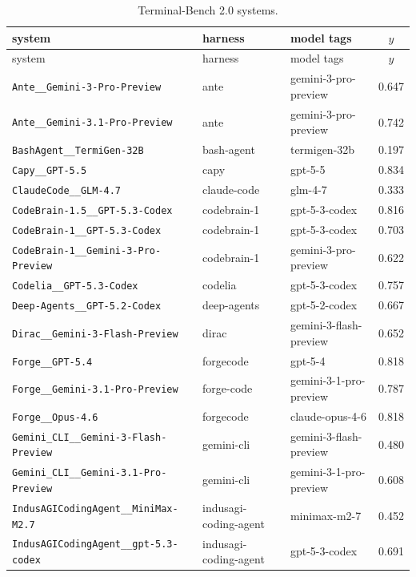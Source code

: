 \begin{center}\scriptsize
\begin{longtable}{lllc}
\caption{Terminal-Bench 2.0 systems.}\label{tab:tb2-systems}\\
\toprule
system & harness & model tags & $y$ \\
\midrule
\endfirsthead
\toprule
system & harness & model tags & $y$ \\
\midrule
\endhead
\bottomrule
\endlastfoot
\texttt{Ante\_\_Gemini-3-Pro-Preview} & ante & gemini-3-pro-preview & 0.647 \\
\texttt{Ante\_\_Gemini-3.1-Pro-Preview} & ante & gemini-3-pro-preview & 0.742 \\
\texttt{BashAgent\_\_TermiGen-32B} & bash-agent & termigen-32b & 0.197 \\
\texttt{Capy\_\_GPT-5.5} & capy & gpt-5-5 & 0.834 \\
\texttt{ClaudeCode\_\_GLM-4.7} & claude-code & glm-4-7 & 0.333 \\
\texttt{CodeBrain-1.5\_\_GPT-5.3-Codex} & codebrain-1 & gpt-5-3-codex & 0.816 \\
\texttt{CodeBrain-1\_\_GPT-5.3-Codex} & codebrain-1 & gpt-5-3-codex & 0.703 \\
\texttt{CodeBrain-1\_\_Gemini-3-Pro-Preview} & codebrain-1 & gemini-3-pro-preview & 0.622 \\
\texttt{Codelia\_\_GPT-5.3-Codex} & codelia & gpt-5-3-codex & 0.757 \\
\texttt{Deep-Agents\_\_GPT-5.2-Codex} & deep-agents & gpt-5-2-codex & 0.667 \\
\texttt{Dirac\_\_Gemini-3-Flash-Preview} & dirac & gemini-3-flash-preview & 0.652 \\
\texttt{Forge\_\_GPT-5.4} & forgecode & gpt-5-4 & 0.818 \\
\texttt{Forge\_\_Gemini-3.1-Pro-Preview} & forge-code & gemini-3-1-pro-preview & 0.787 \\
\texttt{Forge\_\_Opus-4.6} & forgecode & claude-opus-4-6 & 0.818 \\
\texttt{Gemini\_CLI\_\_Gemini-3-Flash-Preview} & gemini-cli & gemini-3-flash-preview & 0.480 \\
\texttt{Gemini\_CLI\_\_Gemini-3.1-Pro-Preview} & gemini-cli & gemini-3-1-pro-preview & 0.608 \\
\texttt{IndusAGICodingAgent\_\_MiniMax-M2.7} & indusagi-coding-agent & minimax-m2-7 & 0.452 \\
\texttt{IndusAGICodingAgent\_\_gpt-5.3-codex} & indusagi-coding-agent & gpt-5-3-codex & 0.691 \\

\end{longtable}
\end{center}
